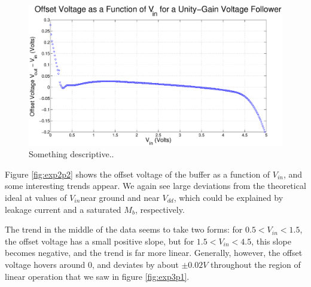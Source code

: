 \documentclass{article}
\newcommand{\Vdd}{{$V_{dd}$}}
\newcommand{\Vin}{{$V_{in}$}}
\newcommand{\Mb}{{$M_{b}$}}
\begin{document}
\begin{figure}[H]
\centering
\includegraphics[width=\linewidth]{../Figures/Exp3P2.eps}
\caption{Something descriptive..}
\label{fig:exp3p2}
\end{figure}

Figure \ref{fig:exp2p2} shows the offset voltage of the buffer as a function of \Vin, and some interesting trends appear. We again see large deviations from the theoretical ideal at values of \Vin near ground and near \Vdd, which could be explained by leakage current and a saturated \Mb, respectively.

The trend in the middle of the data seems to take two forms: for $0.5 < V_{in} < 1.5$, the offset voltage has a small positive slope, but for $1.5 < V_{in} < 4.5$, this slope becomes negative, and the trend is far more linear. Generally, however, the offset voltage hovers around 0, and deviates by about $\pm 0.02 V$ throughout the region of linear operation that we saw in figure \ref{fig:exp3p1}. 
\end{document}
